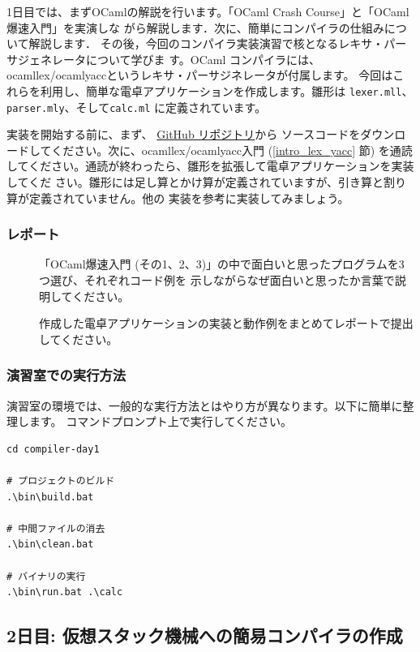 \documentclass[a4paper,11pt]{jsarticle}
\begin{document}
1日目では、まずOCamlの解説を行います。「OCaml Crash Course」と「OCaml爆速入門」を実演しな
がら解説します．次に、簡単にコンパイラの仕組みについて解説します．
その後，今回のコンパイラ実装演習で核となるレキサ・パーサジェネレータについて学びま
す。OCaml コンパイラには、ocamllex/ocamlyaccというレキサ・パーサジネレータが付属します。
今回はこれらを利用し、簡単な電卓アプリケーションを作成します。雛形は \verb|lexer.mll|、
\verb|parser.mly|、そして\verb|calc.ml| に定義されています。

実装を開始する前に、まず、
\href{https://github.com/tmu-compiler-info-sys-exp-I/compiler-day1}{GitHub リポジトリ}から
ソースコードをダウンロードしてください。次に、ocamllex/ocamlyacc入門 (\ref{intro_lex_yacc}
節) を通読してください。通読が終わったら、雛形を拡張して電卓アプリケーションを実装してくだ
さい。雛形には足し算とかけ算が定義されていますが、引き算と割り算が定義されていません。他の
実装を参考に実装してみましょう。

\subsubsection{レポート}

\begin{description}
\item []
  「OCaml爆速入門 (その1、2、3)」の中で面白いと思ったプログラムを3つ選び、それぞれコード例を
示しながらなぜ面白いと思ったか言葉で説明してください。
\item []
  作成した電卓アプリケーションの実装と動作例をまとめてレポートで提出してください。
\end{description}

\subsubsection{演習室での実行方法}

演習室の環境では、一般的な実行方法とはやり方が異なります。以下に簡単に整理します。
コマンドプロンプト上で実行してください。

\begin{lstlisting}
cd compiler-day1

# プロジェクトのビルド
.\bin\build.bat

# 中間ファイルの消去
.\bin\clean.bat

# バイナリの実行
.\bin\run.bat .\calc
\end{lstlisting}

\subsection{2日目: 仮想スタック機械への簡易コンパイラの作成}
\end{document}
